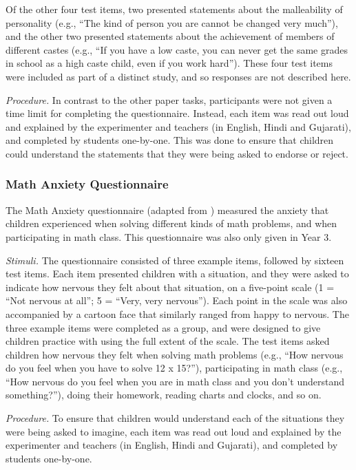 \documentclass[11pt]{article}
\begin{document}
Of the other four test items, two presented statements about the malleability of personality (e.g., ``The kind of person you are cannot be changed very much''), and the other two presented statements about the achievement of members of different castes (e.g., ``If you have a low caste, you can never get the same grades in school as a high caste child, even if you work hard''). These four test items were included as part of a distinct study, and so responses are not described here.  

{\it Procedure.} In contrast to the other paper tasks, participants were not given a time limit for completing the questionnaire. Instead, each item was read out loud and explained by the experimenter and teachers (in English, Hindi and Gujarati), and completed by students one-by-one. This was done to ensure that children could understand the statements that they were being asked to endorse or reject. 

\subsubsection{Math Anxiety Questionnaire}

The Math Anxiety questionnaire (adapted from ) measured the anxiety that children experienced when solving different kinds of math problems, and when participating in math class. This questionnaire was also only given in Year 3.

{\it Stimuli.} The questionnaire consisted of three example items, followed by sixteen test items. Each item presented children with a situation, and they were asked to indicate how nervous they felt about that situation, on a five-point scale (1 = ``Not nervous at all''; 5 = ``Very, very nervous''). Each point in the scale was also accompanied by a cartoon face that similarly ranged from happy to nervous. The three example items were completed as a group, and were designed to give children practice with using the full extent of the scale. The test items asked children how nervous they felt when solving math problems (e.g., ``How nervous do you feel when you have to solve 12 x 15?''), participating in math class (e.g., ``How nervous do you feel when you are in math class and you don't understand something?''), doing their homework, reading charts and clocks, and so on. 

{\it Procedure.} To ensure that children would understand each of the situations they were being asked to imagine, each item was read out loud and explained by the experimenter and teachers (in English, Hindi and Gujarati), and completed by students one-by-one. 
\end{document}
